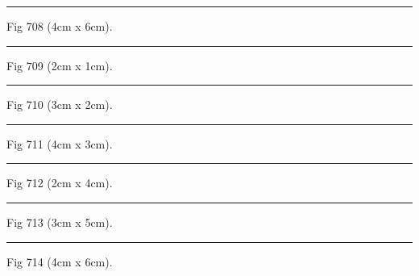 \documentclass[a4paper,11pt]{article}
\begin{document}
\begin{swarmwrap}%
  \begin{minipage}[t]{4cm}
    \centering
    \rule{\linewidth}{6cm}
    {\footnotesize Fig 708 (4cm x 6cm).}
  \end{minipage}%
\end{swarmwrap}%
\swarmwrapnext
\lipsum[108]%

\begin{swarmwrap}%
  \begin{minipage}[t]{2cm}
    \centering
    \rule{\linewidth}{1cm}
    {\footnotesize Fig 709 (2cm x 1cm).}
  \end{minipage}%
\end{swarmwrap}%
\swarmwrapnext
\lipsum[109]%

\begin{swarmwrap}%
  \begin{minipage}[t]{3cm}
    \centering
    \rule{\linewidth}{2cm}
    {\footnotesize Fig 710 (3cm x 2cm).}
  \end{minipage}%
\end{swarmwrap}%
\swarmwrapnext
\lipsum[110]%

\begin{swarmwrap}%
  \begin{minipage}[t]{4cm}
    \centering
    \rule{\linewidth}{3cm}
    {\footnotesize Fig 711 (4cm x 3cm).}
  \end{minipage}%
\end{swarmwrap}%
\swarmwrapnext
\lipsum[111]%

\begin{swarmwrap}%
  \begin{minipage}[t]{2cm}
    \centering
    \rule{\linewidth}{4cm}
    {\footnotesize Fig 712 (2cm x 4cm).}
  \end{minipage}%
\end{swarmwrap}%
\swarmwrapnext
\lipsum[112]%

\begin{swarmwrap}%
  \begin{minipage}[t]{3cm}
    \centering
    \rule{\linewidth}{5cm}
    {\footnotesize Fig 713 (3cm x 5cm).}
  \end{minipage}%
\end{swarmwrap}%
\swarmwrapnext
\lipsum[113]%

\begin{swarmwrap}%
  \begin{minipage}[t]{4cm}
    \centering
    \rule{\linewidth}{6cm}
    {\footnotesize Fig 714 (4cm x 6cm).}
  \end{minipage}%
\end{swarmwrap}%
\swarmwrapnext
\lipsum[114]%
\end{document}
